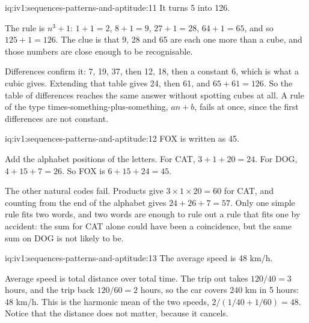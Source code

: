 \begin{solution}{iq:iv1:sequences-patterns-and-aptitude:11}
It turns 5 into 126.

The rule is $n^3 + 1$: $1 + 1 = 2$, $8 + 1 = 9$, $27 + 1 = 28$, $64 + 1 = 65$, and so $125 + 1 = 126$. The clue is that 9, 28 and 65 are each one more than a cube, and those numbers are close enough to be recognisable.

Differences confirm it: 7, 19, 37, then 12, 18, then a constant 6, which is what a cubic gives. Extending that table gives 24, then 61, and $65 + 61 = 126$. So the table of differences reaches the same answer without spotting cubes at all. A rule of the type times-something-plus-something, $an + b$, fails at once, since the first differences are not constant.

\end{solution}

\begin{solution}{iq:iv1:sequences-patterns-and-aptitude:12}
FOX is written as 45.

Add the alphabet positions of the letters. For CAT, $3 + 1 + 20 = 24$. For DOG, $4 + 15 + 7 = 26$. So FOX is $6 + 15 + 24 = 45$.

The other natural codes fail. Products give $3 \times 1 \times 20 = 60$ for CAT, and counting from the end of the alphabet gives $24 + 26 + 7 = 57$. Only one simple rule fits two words, and two words are enough to rule out a rule that fits one by accident: the sum for CAT alone could have been a coincidence, but the same sum on DOG is not likely to be.

\end{solution}

\begin{solution}{iq:iv1:sequences-patterns-and-aptitude:13}
The average speed is 48 km/h.

Average speed is total distance over total time. The trip out takes $120/40 = 3$ hours, and the trip back $120/60 = 2$ hours, so the car covers 240 km in 5 hours: 48 km/h. This is the harmonic mean of the two speeds, $2/(1/40 + 1/60) = 48$. Notice that the distance does not matter, because it cancels.

\end{solution}

